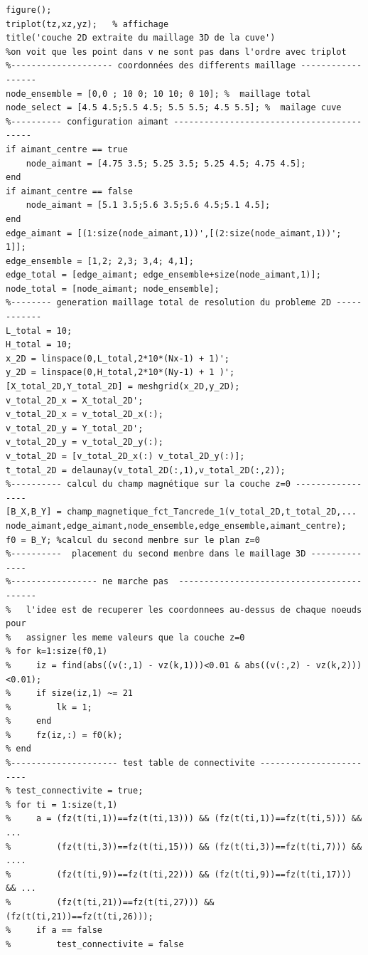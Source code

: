 \documentclass[a4paper,12pt,titlepage]{report}
\begin{document}
\begin{onehalfspace}
\begin{appendix}
\begin{verbatim}
figure();
triplot(tz,xz,yz);   % affichage
title('couche 2D extraite du maillage 3D de la cuve')
%on voit que les point dans v ne sont pas dans l'ordre avec triplot         
%-------------------- coordonnées des differents maillage ------------------
node_ensemble = [0,0 ; 10 0; 10 10; 0 10]; %  maillage total
node_select = [4.5 4.5;5.5 4.5; 5.5 5.5; 4.5 5.5]; %  mailage cuve 
%---------- configuration aimant ------------------------------------------
if aimant_centre == true
    node_aimant = [4.75 3.5; 5.25 3.5; 5.25 4.5; 4.75 4.5]; 
end
if aimant_centre == false
    node_aimant = [5.1 3.5;5.6 3.5;5.6 4.5;5.1 4.5];       
end
edge_aimant = [(1:size(node_aimant,1))',[(2:size(node_aimant,1))'; 1]];       
edge_ensemble = [1,2; 2,3; 3,4; 4,1];                               
edge_total = [edge_aimant; edge_ensemble+size(node_aimant,1)];       
node_total = [node_aimant; node_ensemble];                      
%-------- generation maillage total de resolution du probleme 2D ------------
L_total = 10;
H_total = 10;
x_2D = linspace(0,L_total,2*10*(Nx-1) + 1)';
y_2D = linspace(0,H_total,2*10*(Ny-1) + 1 )';
[X_total_2D,Y_total_2D] = meshgrid(x_2D,y_2D);
v_total_2D_x = X_total_2D';
v_total_2D_x = v_total_2D_x(:);
v_total_2D_y = Y_total_2D';
v_total_2D_y = v_total_2D_y(:);
v_total_2D = [v_total_2D_x(:) v_total_2D_y(:)];
t_total_2D = delaunay(v_total_2D(:,1),v_total_2D(:,2)); 
%---------- calcul du champ magnétique sur la couche z=0 ----------------- 
[B_X,B_Y] = champ_magnetique_fct_Tancrede_1(v_total_2D,t_total_2D,...
node_aimant,edge_aimant,node_ensemble,edge_ensemble,aimant_centre);
f0 = B_Y; %calcul du second menbre sur le plan z=0
%----------  placement du second menbre dans le maillage 3D --------------
%----------------- ne marche pas  ------------------------------------------
%   l'idee est de recuperer les coordonnees au-dessus de chaque noeuds pour
%   assigner les meme valeurs que la couche z=0
% for k=1:size(f0,1)
%     iz = find(abs((v(:,1) - vz(k,1)))<0.01 & abs((v(:,2) - vz(k,2)))<0.01);
%     if size(iz,1) ~= 21
%         lk = 1;
%     end
%     fz(iz,:) = f0(k);                                     
% end
%--------------------- test table de connectivite ------------------------
% test_connectivite = true;
% for ti = 1:size(t,1)
%     a = (fz(t(ti,1))==fz(t(ti,13))) && (fz(t(ti,1))==fz(t(ti,5))) && ...
%         (fz(t(ti,3))==fz(t(ti,15))) && (fz(t(ti,3))==fz(t(ti,7))) && ....
%         (fz(t(ti,9))==fz(t(ti,22))) && (fz(t(ti,9))==fz(t(ti,17))) && ...
%         (fz(t(ti,21))==fz(t(ti,27))) && (fz(t(ti,21))==fz(t(ti,26)));
%     if a == false
%         test_connectivite = false

\end{verbatim}
\end{appendix}
\end{onehalfspace}
\end{document}

